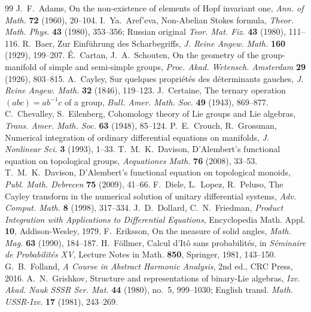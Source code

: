 \documentclass[11pt,reqno]{amsart}
\theoremstyle{definition}
\theoremstyle{remark}
\numberwithin{equation}{section}
\begin{document}
\begin{thebibliography}{99}\small
{} J.~F.~Adams, On the non-existence of elements of Hopf invariant one, \emph{Ann. of Math.} \textbf{72} (1960), 20--104.
 I.~Ya.~Aref'eva, Non-Abelian Stokes formula, \emph{Theor. Math. Phys.} \textbf{43} (1980), 353--356; Russian original \emph{Teor. Mat. Fiz.} \textbf{43} (1980), 111--116.
 R.~Baer, Zur Einf\"uhrung des Scharbegriffs, \emph{J. Reine Angew. Math.} \textbf{160} (1929), 199--207.
 \'E.~Cartan, J.~A.~Schouten, On the geometry of the group-manifold of simple and semi-simple groups, \emph{Proc. Akad. Wetensch. Amsterdam} \textbf{29} (1926), 803--815.
 A.~Cayley, Sur quelques propri\'et\'es des d\'eterminants gauches, \emph{J. Reine Angew. Math.} \textbf{32} (1846), 119--123.
 J.~Certaine, The ternary operation $(abc)=ab^{-1}c$ of a group, \emph{Bull. Amer. Math. Soc.} \textbf{49} (1943), 869--877.
 C.~Chevalley, S.~Eilenberg, Cohomology theory of Lie groups and Lie algebras, \emph{Trans. Amer. Math. Soc.} \textbf{63} (1948), 85--124.
 P.~E.~Crouch, R.~Grossman, Numerical integration of ordinary differential equations on manifolds, \emph{J. Nonlinear Sci.} \textbf{3} (1993), 1--33.
 T.~M.~K.~Davison, D'Alembert's functional equation on topological groups, \emph{Aequationes Math.} \textbf{76} (2008), 33--53.
 T.~M.~K.~Davison, D'Alembert's functional equation on topological monoids, \emph{Publ. Math. Debrecen} \textbf{75} (2009), 41--66.
 F.~Diele, L.~Lopez, R.~Peluso, The Cayley transform in the numerical solution of unitary differential systems, \emph{Adv. Comput. Math.} \textbf{8} (1998), 317--334.
 J.~D.~Dollard, C.~N.~Friedman, \emph{Product Integration with Applications to Differential Equations}, Encyclopedia Math. Appl. \textbf{10}, Addison-Wesley, 1979.
 F.~Eriksson, On the measure of solid angles, \emph{Math. Mag.} \textbf{63} (1990), 184--187.
 H.~F\"ollmer, Calcul d'It\^o sans probabilit\'es, in \emph{S\'eminaire de Probabilit\'es XV}, Lecture Notes in Math. \textbf{850}, Springer, 1981, 143--150.
 G.~B.~Folland, \emph{A Course in Abstract Harmonic Analysis}, 2nd ed., CRC Press, 2016.
 A.~N.~Grishkov, Structure and representations of binary-Lie algebras, \emph{Izv. Akad. Nauk SSSR Ser. Mat.} \textbf{44} (1980), no.~5, 999--1030; English transl. \emph{Math. USSR-Izv.} \textbf{17} (1981), 243--269.

\end{thebibliography}
\end{document}
